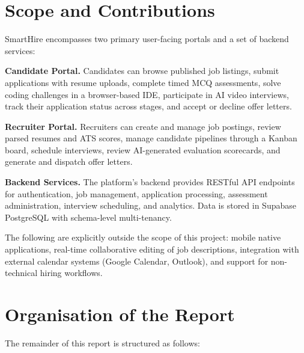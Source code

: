 \section{Scope and Contributions}
\label{sec:scope}

SmartHire encompasses two primary user-facing portals and a set of backend services:

\textbf{Candidate Portal.} Candidates can browse published job listings, submit applications with resume uploads, complete timed MCQ assessments, solve coding challenges in a browser-based IDE, participate in AI video interviews, track their application status across stages, and accept or decline offer letters.

\textbf{Recruiter Portal.} Recruiters can create and manage job postings, review parsed resumes and ATS scores, manage candidate pipelines through a Kanban board, schedule interviews, review AI-generated evaluation scorecards, and generate and dispatch offer letters.

\textbf{Backend Services.} The platform's backend provides RESTful API endpoints for authentication, job management, application processing, assessment administration, interview scheduling, and analytics. Data is stored in Supabase PostgreSQL with schema-level multi-tenancy.

The following are explicitly outside the scope of this project: mobile native applications, real-time collaborative editing of job descriptions, integration with external calendar systems (Google Calendar, Outlook), and support for non-technical hiring workflows.

\section{Organisation of the Report}
\label{sec:organisation}

The remainder of this report is structured as follows:

